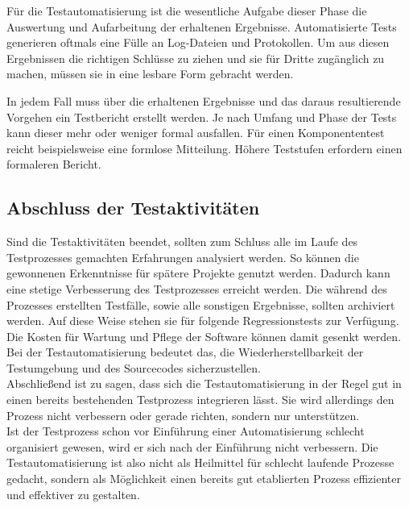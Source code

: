 Für die Testautomatisierung ist die wesentliche Aufgabe dieser Phase die Auswertung und Aufarbeitung der erhaltenen Ergebnisse. Automatisierte Tests generieren oftmals eine Fülle an Log-Dateien und Protokollen. Um aus diesen Ergebnissen die richtigen Schlüsse zu ziehen und sie für Dritte zugänglich zu machen, müssen sie in eine lesbare Form gebracht werden.

In jedem Fall muss über die erhaltenen Ergebnisse und das daraus resultierende Vorgehen ein Testbericht erstellt werden. Je nach Umfang und Phase der Tests kann dieser mehr oder weniger formal ausfallen. Für einen Komponententest reicht beispielsweise eine formlose Mitteilung. Höhere Teststufen erfordern einen formaleren Bericht.



\subsection{Abschluss der Testaktivitäten}
\label{subsec:abschluss_der_testaktivitäten}
Sind die Testaktivitäten beendet, sollten zum Schluss alle im Laufe des Testprozesses gemachten Erfahrungen analysiert werden. So können die gewonnenen Erkenntnisse für spätere Projekte genutzt werden. Dadurch kann eine stetige Verbesserung des Testprozesses erreicht werden.
Die während des Prozesses erstellten Testfälle, sowie alle sonstigen Ergebnisse, sollten archiviert werden. Auf diese Weise stehen sie für folgende Regressionstests zur Verfügung. Die Kosten für Wartung und Pflege der Software können damit gesenkt werden.
Bei der Testautomatisierung bedeutet das, die Wiederherstellbarkeit der Testumgebung und des Sourcecodes sicherzustellen.
\newline\\
Abschließend ist zu sagen, dass sich die Testautomatisierung in der Regel gut in einen bereits bestehenden Testprozess integrieren lässt. Sie wird allerdings \glqq den Prozess nicht verbessern oder gerade richten, sondern nur unterstützen.\grqq\ \cite[S.21]{seidl_basiswissen_2012} \\ Ist der Testprozess schon vor Einführung einer Automatisierung schlecht organisiert gewesen, wird er sich nach der Einführung nicht verbessern.
Die Testautomatisierung ist also nicht als Heilmittel für schlecht laufende Prozesse gedacht, sondern als Möglichkeit einen bereits gut etablierten Prozess effizienter und effektiver zu gestalten.

